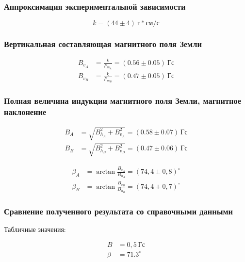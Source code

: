 \documentclass[a4paper, 12pt]{article}
\begin{document}
            \subsubsection{Аппроксимация экспериментальной зависимости}

                $$
                    k = (44 \pm 4)~г*см/с
                $$

            \subsubsection{Вертикальная составляющая магнитного поля Земли}

                \begin{align*}
                    B_{v_A} &= \frac{k}{P_{m_A}} = (0.56 \pm 0.05)~Гс \\
                    B_{v_B} &= \frac{k}{P_{m_B}} = (0.47 \pm 0.05)~Гс
                \end{align*}

            \subsubsection{Полная величина индукции магнитного поля Земли, магнитное наклонение}

                \begin{align*}
                    B_A &= \sqrt{B_{h_A}^2 + B_{v_A}^2} = (0.58 \pm 0.07)~Гс \\
                    B_B &= \sqrt{B_{h_B}^2 + B_{v_B}^2} = (0.47 \pm 0.06)~Гс
                \end{align*}

                \begin{align*}
                    \beta_A &= \arctan{\frac{B_{v_A}}{B_{h_A}}} = (74,4 \pm 0,8)^{\circ} \\
                    \beta_B &= \arctan{\frac{B_{v_B}}{B_{h_B}}} = (74,4 \pm 0,7)^{\circ}
                \end{align*}

            \subsubsection{Сравнение полученного результата со справочными данными}

                Табличные значения:

                \begin{align*}
                    B &= 0,5~Гс \\
                    \beta &= 71.3^{\circ}
                \end{align*}
\end{document}
